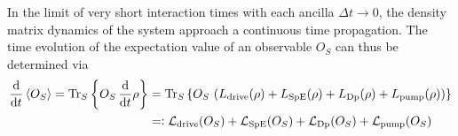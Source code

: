 In the limit of very short interaction times with each ancilla $\Delta t\rightarrow0$, the density matrix dynamics of the system approach a continuous time propagation. The time evolution of the expectation value of an observable $O_S$ can thus be determined via 
\begin{align}
    \frac{\text{d}}{\text{d}t} \braket{O_S}=\text{Tr}_S\left\{O_S\,\frac{\text{d}}{\text{d}t}\rho\right\}&=\text{Tr}_S\left\{O_S\,\left(L_\text{drive}(\rho)+L_\text{SpE}(\rho)+L_\text{Dp}(\rho)+L_\text{pump}(\rho)\right)\right\}\notag\\
    &=\vcentcolon \mathcal{L}_\text{drive}(O_S)+\mathcal{L}_\text{SpE}(O_S)+\mathcal{L}_\text{Dp}(O_S)+\mathcal{L}_\text{pump}(O_S)
\end{align}

